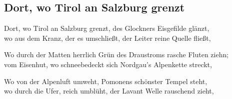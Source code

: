 
\subsection*{Dort, wo Tirol an Salzburg grenzt}
%
%

\thestrophe Dort, wo Tirol an Salzburg grenzt, des Glockners Eisgefilde glänzt, \\
wo aus dem Kranz, der es umschließt, der Leiter reine Quelle fließt, \\

\thestrophe Wo durch der Matten herrlich Grün des Draustroms rasche Fluten ziehn; \\
vom Eisenhut, wo schneebedeckt sich Nordgau's Alpenkette streckt, \\

\thestrophe Wo von der Alpenluft umweht, Pomonens schönster Tempel steht, \\
wo durch die Ufer, reich umblüht, der Lavant Welle rauschend zieht, \\
